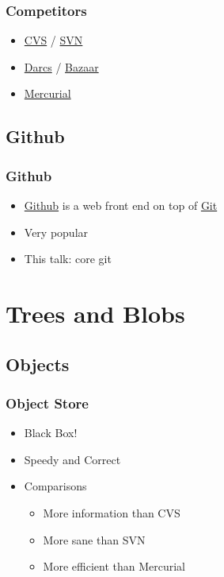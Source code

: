 \begin{frame}
  \frametitle{Competitors}
  \begin{itemize}
  \item \href{https://www.nongnu.org/cvs/}{CVS} / \href{https://subversion.apache.org/}{SVN}
  \pause
  \item \href{http://darcs.net/}{Darcs} / \href{https://en.wikipedia.org/wiki/GNU_Bazaar}{Bazaar}
  \pause
  \item \href{https://www.mercurial-scm.org/}{Mercurial}
  \end{itemize}
\end{frame}

\subsection{Github}

\begin{frame}
  \frametitle{Github}
  \begin{itemize}
  \item \href{https://github.com/}{Github} is a web front end on top of \href{https://git-scm.com/}{Git}
  \pause
  \item Very popular
  \pause
  \item This talk: core git
  \end{itemize}
\end{frame}

\section{Trees and Blobs}

\subsection{Objects}

\begin{frame}
  \frametitle{Object Store}
  \begin{itemize}
  \item Black Box!
  \pause
  \item Speedy and Correct
  \pause
  \item Comparisons
    \begin{itemize}
    \item More information than CVS
    \item More sane than SVN
    \item More efficient than Mercurial
    \end{itemize}
  \end{itemize}
\end{frame}

